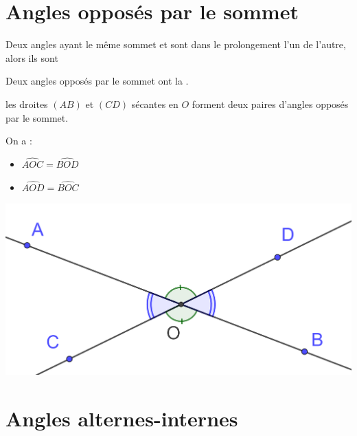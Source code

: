 \documentclass[12pt,a4paper]{article}
\date{}
\title{}
\begin{document}








\section{Angles opposés par le sommet}


\begin{mydef}
	Deux angles ayant le même sommet et sont dans le prolongement l'un de l'autre, alors ils sont 
\end{mydef}

\begin{myprop}
	Deux angles opposés par le sommet ont la .
\end{myprop}


\begin{myex}
	
	\begin{multicols}{2}
		les droites $(AB)$ et $(CD)$ sécantes en $O$ forment deux paires d'angles opposés par le sommet.
		
		On a :
		\begin{itemize}
			\item $\widehat{AOC} = \widehat{BOD}$
			\item $\widehat{AOD} = \widehat{BOC}$
		\end{itemize}	
	
		\includegraphics[scale=0.15]{opposes}
	\end{multicols}
	
\end{myex}
\section{Angles alternes-internes}
\end{document}
